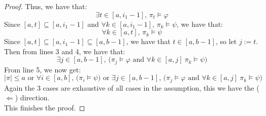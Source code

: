 \documentclass[runningheads]{llncs}
\renewcommand{\phi}{\varphi}
\begin{document}
\begin{proof}
\indent \indent Thus, we have that: 
\[
\exists t \in [a, i_1 - 1] \text{, } \pi_t \vDash \phi \tag{3}
\]
\indent \indent Since  $[a, t] \subseteq [a, i_1 - 1]$ and $\forall k \in [a, i_1 - 1] \text{, } \pi_{k} \vDash \psi$, we have that:
\[ 
\forall k \in [a, t]\text{, } \pi_{k} \vDash \psi \tag{4}
\]
\indent \indent Since $[a,t] \subseteq [a, i_1 - 1] \subseteq [a,b-1]$, we have that $t \in [a,b-1]$, so let $j := t$.
\indent \indent Then from lines 3 and 4, we have that:
\[
\exists j \in [a,b-1] \text{, (} \pi_j \vDash \phi \text{ and } \forall k \in [a, j] \ \pi_k \vDash \psi \text{)} \tag{5}
\]
\indent \indent From line 5, we now get:
\[ 
|\pi| \leq a \text{ or } \forall i \in [a,b] \text{, (} \pi_i \vDash \psi \text{) or } \exists j \in [a,b-1] \text{, (} \pi_j \vDash \phi \text{ and } \forall k \in [a, j] \ \pi_k \vDash \psi \text{)} \tag{B1}
\]
\indent Again the 3 cases are exhaustive of all cases in the assumption, this we have the ($\Leftarrow$) direction.\\
This finishes the proof.
\end{proof}
\end{document}
